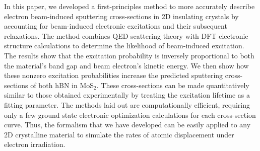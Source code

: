 \documentclass{article}
\begin{document}
In this paper, we developed a first-principles method to more accurately
describe electron beam-induced sputtering cross-sections in 2D insulating
crystals by accounting for beam-induced electronic excitations and their
subsequent relaxations.
The method combines QED scattering theory with DFT electronic structure
calculations to determine the likelihood of beam-induced excitation.
The results show that the excitation probability is inversely proportional
to both the material's band gap and beam electron's kinetic energy.
We then show how these nonzero excitation probabilities increase the predicted
sputtering cross-sections of both hBN in MoS$_2$.  These cross-sections can be
made quantitatively similar to those obtained experimentally by treating the
excitation lifetime as a fitting parameter.
The methods laid out are computationally efficient, requiring only a few
ground state electronic optimization calculations for each cross-section curve.
Thus, the formalism that we have developed can be easily applied to any 2D
crystalline material to simulate the rates of atomic displacement under
electron irradiation.
\end{document}

